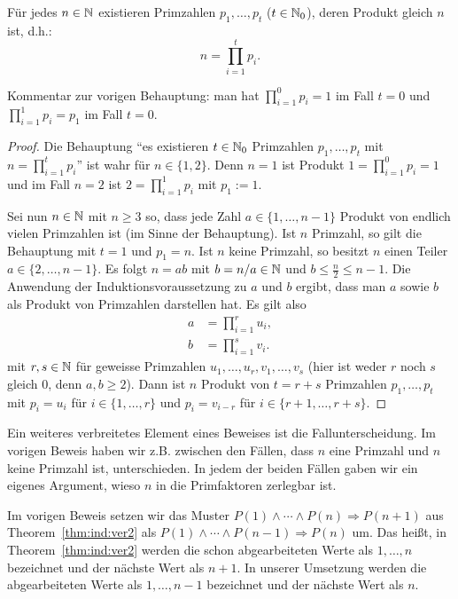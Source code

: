 \begin{thm} 
	Für jedes $n \in \mathbb{N}$ existieren  Primzahlen $p_1,\ldots,p_t$ ($t \in \mathbb{N}_0$), deren Produkt gleich $n$ ist, d.h.:  
	\[
		n = \prod_{i=1}^t p_i.
	\] 
\end{thm} 

\begin{bem}
	Kommentar zur  vorigen Behauptung: man hat $\prod_{i=1}^0 p_i = 1$ im Fall $t=0$ und $\prod_{i=1}^1 p_i = p_1$ im Fall $t=0$. 
\end{bem} 


\begin{proof} 
	Die Behauptung ``es existieren $t \in \mathbb{N}_0$ Primzahlen $p_1,\ldots,p_t$ mit $n=\prod_{i=1}^t p_i$'' ist wahr für $n \in\{1,2\}$. Denn $n=1$ ist Produkt $1= \prod_{i=1}^0 p_i = 1$ und im Fall $n=2$ ist $2 = \prod_{i=1}^1 p_i$ mit $p_1:=1$.
	
	Sei nun $n \in \mathbb{N}$ mit $n \ge 3$ so, dass jede Zahl $a \in \{1,\ldots,n-1\}$ Produkt von endlich vielen Primzahlen ist (im Sinne der Behauptung). Ist $n$ Primzahl, so gilt die Behauptung mit $t=1$ und $p_1 = n$. Ist $n$ keine Primzahl, so besitzt $n$ einen Teiler $a \in \{2,\ldots,n-1\}$. Es folgt $n = a b$ mit $b = n / a \in \mathbb{N}$ und $b \le \frac{n}{2} \le n-1$. Die Anwendung der Induktionsvoraussetzung zu $a$ und $b$ ergibt, dass man $a$ sowie $b$ als Produkt von Primzahlen darstellen hat. Es gilt also 
	\begin{align*}
			a & = \prod_{i=1}^{r} u_i, 
		\\	b & = \prod_{i=1}^s  v_i.
	\end{align*} 
	mit $r, s \in \mathbb{N}$ für geweisse Primzahlen $u_1,\ldots,u_r,v_1,\ldots,v_s$ (hier ist weder $r$ noch $s$ gleich $0$, denn $a,b \ge 2$). 
	Dann ist $n$ Produkt von $t = r+s$ Primzahlen $p_1,\ldots,p_t$ mit $p_i = u_i$ für $i \in \{1,\ldots,r\}$ und $p_i = v_{i-r}$ für $i \in \{r+1,\ldots,r+s\}$. 
\end{proof} 

\begin{bem}[Fallunterscheidung] 
	Ein weiteres verbreitetes Element eines Beweises ist die Fallunterscheidung. Im vorigen Beweis haben wir z.B. zwischen den Fällen, dass $n$ eine Primzahl und $n$ keine Primzahl ist, unterschieden. In jedem der beiden Fällen gaben wir ein eigenes Argument, wieso $n$ in die Primfaktoren zerlegbar ist.  
\end{bem} 

\begin{bem}
	Im vorigen Beweis setzen wir das Muster $P(1) \wedge \cdots \wedge P(n) \Rightarrow P(n+1)$ aus Theorem~\ref{thm:ind:ver2} als $P(1) \wedge \cdots \wedge P(n-1) \Rightarrow P(n)$ um. Das heißt, in Theorem~\ref{thm:ind:ver2} werden die schon abgearbeiteten Werte als $1,\ldots,n$ bezeichnet und der nächste Wert als $n+1$. In unserer Umsetzung werden die abgearbeiteten Werte als $1,\ldots,n-1$ bezeichnet und der nächste Wert als $n$. 
\end{bem} 


